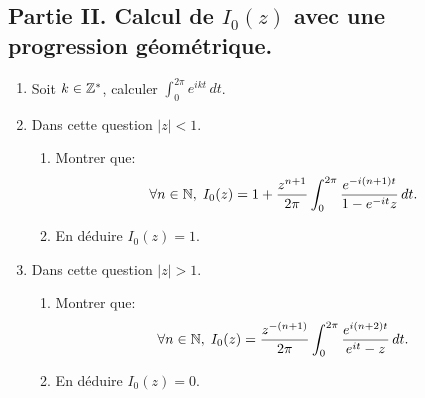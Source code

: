 \subsection*{Partie II. Calcul de $I_0(z)$ avec une progression géométrique.}
\begin{enumerate}
 \item Soit $k\in \mathbb{Z}^*$, calculer $\int_{0}^{2\pi}e^{ikt}\, dt$.
 \item Dans cette question $|z| < 1$.
 \begin{enumerate}
  \item Montrer que:
\[
 \forall n \in \mathbb{N}, \; I_0(z) = 1 + \frac{z^{n+1}}{2\pi} \int_{0}^{2\pi} \frac{e^{-i(n+1)t}}{1-e^{-it}z}\, dt.
\]
  \item En déduire $I_0(z) = 1$.
 \end{enumerate}

 \item Dans cette question $|z| > 1$.
 \begin{enumerate}
  \item Montrer que:
\[
 \forall n \in \mathbb{N}, \; I_0(z) =  \frac{z^{-(n+1)}}{2\pi}\int_0^{2\pi}\frac{e^{i(n+2)t}}{e^{it} - z}\, dt.
\]
  \item En déduire $I_0(z) = 0$.
 \end{enumerate}
\end{enumerate}

